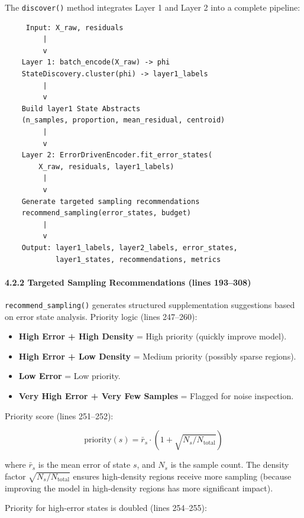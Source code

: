 \documentclass[
  12pt,
]{article}
\providecommand{\tightlist}{%
  \setlength{\itemsep}{0pt}\setlength{\parskip}{0pt}}
\begin{document}
The \texttt{discover()} method integrates Layer 1 and Layer 2 into a complete pipeline:

\begin{verbatim}
     Input: X_raw, residuals
         |
         v
    Layer 1: batch_encode(X_raw) -> phi
    StateDiscovery.cluster(phi) -> layer1_labels
         |
         v
    Build layer1 State Abstracts
    (n_samples, proportion, mean_residual, centroid)
         |
         v
    Layer 2: ErrorDrivenEncoder.fit_error_states(
        X_raw, residuals, layer1_labels)
         |
         v
    Generate targeted sampling recommendations
    recommend_sampling(error_states, budget)
         |
         v
    Output: layer1_labels, layer2_labels, error_states,
            layer1_states, recommendations, metrics
\end{verbatim}

\paragraph{4.2.2 Targeted Sampling Recommendations (lines 193--308)}\label{targeted-sampling-recommendations}

\texttt{recommend\_sampling()} generates structured supplementation suggestions based on error state analysis. Priority logic (lines 247--260):

\begin{itemize}
\tightlist
\item
  \textbf{High Error + High Density} = High priority (quickly improve model).
\item
  \textbf{High Error + Low Density} = Medium priority (possibly sparse regions).
\item
  \textbf{Low Error} = Low priority.
\item
  \textbf{Very High Error + Very Few Samples} = Flagged for noise inspection.
\end{itemize}

Priority score (lines 251--252):

\[\text{priority}(s) = \bar{r}_s \cdot (1 + \sqrt{N_s / N_{\text{total}}})\]

where $\bar{r}_s$ is the mean error of state $s$, and $N_s$ is the sample count. The density factor $\sqrt{N_s / N_{\text{total}}}$ ensures high-density regions receive more sampling (because improving the model in high-density regions has more significant impact).

Priority for high-error states is doubled (lines 254--255):
\end{document}
